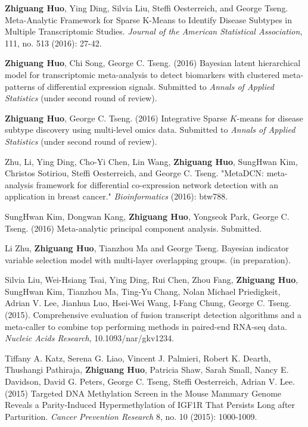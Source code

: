 \documentclass[a4paper, 10pt]{article}
\begin{document}
\begin{thebibliography}{9}
{\bf Zhiguang Huo}, Ying Ding, Silvia Liu, Steffi Oesterreich, and George Tseng. Meta-Analytic Framework for Sparse K-Means to Identify Disease Subtypes in Multiple Transcriptomic Studies. \emph{Journal of the American Statistical Association},  111, no. 513 (2016): 27-42.
 
{\bf Zhiguang Huo}, Chi Song, George C. Tseng. (2016)
Bayesian latent hierarchical model for transcriptomic meta-analysis to detect biomarkers with clustered meta-patterns of differential expression signals. Submitted to \emph{Annals of Applied Statistics} (under second round of review).

{\bf Zhiguang Huo}, George C. Tseng. (2016)
Integrative Sparse $K$-means for disease subtype discovery using multi-level omics data.
Submitted to \emph{Annals of Applied Statistics} (under second round of review).

Zhu, Li, Ying Ding, Cho-Yi Chen, Lin Wang, {\bf Zhiguang Huo}, SungHwan Kim, Christos Sotiriou, Steffi Oesterreich, and George C. Tseng. "MetaDCN: meta-analysis framework for differential co-expression network detection with an application in breast cancer." \emph{Bioinformatics} (2016): btw788.

SungHwan Kim, Dongwan Kang, {\bf Zhiguang Huo}, Yongseok
Park, George C. Tseng. (2016)
Meta-analytic principal component analysis.
Submitted.

Li Zhu, {\bf Zhiguang Huo}, Tianzhou Ma and George Tseng. 
Bayesian indicator variable selection model with multi-layer overlapping groups.
(in preparation).

Silvia Liu, Wei-Hsiang Tsai, Ying Ding, Rui Chen, Zhou Fang, {\bf Zhiguang Huo}, SungHwan Kim, Tianzhou Ma, Ting-Yu Chang, Nolan Michael Priedigkeit, Adrian V. Lee, Jianhua Luo, Hsei-Wei Wang, I-Fang Chung, George C. Tseng. (2015).
Comprehensive evaluation of fusion transcript detection algorithms and a meta-caller to combine top performing methods in paired-end RNA-seq data.
\emph{Nucleic Acids Research}, 10.1093/nar/gkv1234.
 
 Tiffany A. Katz, Serena G. Liao, Vincent J. Palmieri, Robert K. Dearth, Thushangi Pathiraja, {\bf Zhiguang Huo}, Patricia Shaw, Sarah Small, Nancy E. Davidson, David G. Peters, George C. Tseng, Steffi Oesterreich, Adrian V. Lee. (2015) Targeted DNA Methylation Screen in the Mouse Mammary Genome Reveals a Parity-Induced Hypermethylation of IGF1R That Persists Long after Parturition. \emph{Cancer Prevention Research} 8, no. 10 (2015): 1000-1009.


\end{thebibliography}
\end{document}
